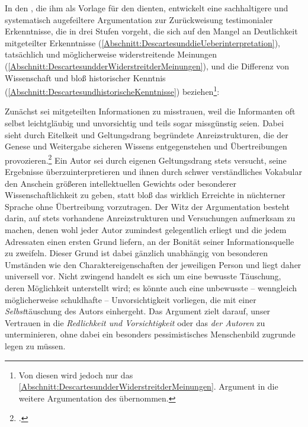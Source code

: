 In den , die ihm als Vorlage für den 
dienten, entwickelt  eine sachhaltigere und systematisch
augefeiltere Argumentation zur Zurückweisung testimonialer Erkenntnisse, die in
drei Stufen vorgeht, die sich auf den Mangel an Deutlichkeit mitgeteilter
Erkenntnisse (\ref{Abschnitt:DescartesunddieUeberinterpretation}), tatsächlich
und möglicherweise widerstreitende Meinungen
(\ref{Abschnitt:DescartesundderWiderstreitderMeinungen}), und die Differenz von
Wissenschaft und bloß historischer Kenntnis
(\ref{Abschnitt:DescartesundhistorischeKenntnisse}) beziehen\footnote{Von
diesen wird jedoch nur das \ref{Abschnitt:DescartesundderWiderstreitderMeinungen}. Argument
in die weitere Argumentation des  übernommen.}:
\begin{nummerierung}
 \item{}\label{Abschnitt:DescartesunddieUeberinterpretation}
 Zunächst sei mitgeteilten Informationen zu misstrauen, weil die Informanten oft
 selbst leichtgläubig und unvorsichtig und teils sogar missgünstig seien. Dabei sieht
  durch Eitelkeit und Geltungsdrang begründete
 Anreizstrukturen, die der Genese und Weitergabe sicheren Wissens entgegenstehen
 und Übertreibungen provozieren.\footnote{\cite[Vgl.][X:
 367.5--23]{Descartes:OeuvresdeDescartes1983}.} Ein Autor sei durch eigenen
 Geltungsdrang stets versucht, seine Ergebnisse überzuinterpretieren und ihnen
 durch schwer verständliches Vokabular den Anschein größeren intellektuellen
 Gewichts oder besonderer Wissenschaftlichkeit zu geben, statt bloß das wirklich
 Erreichte in nüchterner Sprache ohne Übertreibung vorzutragen.
 Der Witz der Argumentation besteht darin, auf stets vorhandene Anreizstrukturen
 und Versuchungen aufmerksam zu machen, denen wohl jeder Autor zumindest
 gelegentlich erliegt und die jedem Adressaten einen ersten Grund liefern, an
 der Bonität seiner Informationsquelle zu zweifeln.
 Dieser Grund ist dabei gänzlich unabhängig von besonderen Umständen wie den
 Charaktereigenschaften der jeweiligen Person und liegt daher universell vor.
 Nicht zwingend handelt es sich um eine bewusste Täuschung, deren Möglichkeit
 unterstellt wird; es könnte auch eine unbewusste -- wenngleich möglicherweise
 schuldhafte -- Unvorsichtigkeit vorliegen, die mit einer \emph{Selbst}täuschung
 des Autors einhergeht. Das Argument zielt darauf, unser Vertrauen in die 
 \emph{Redlichkeit und Vorsichtigkeit} oder das
 \emph{ der Autoren} zu
 unterminieren, ohne dabei ein besonders pessimistisches Menschenbild zugrunde
 legen zu müssen.
 

\end{nummerierung}
